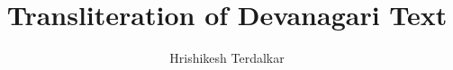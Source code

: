 \documentclass[10pt]{article}
\title{Transliteration of Devanagari Text}
\author{Hrishikesh Terdalkar}
\begin{document}
\maketitle



\pagebreak

% 


\end{document}
